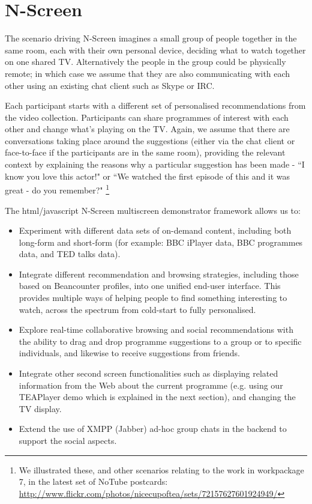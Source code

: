 \documentclass{notube}
\begin{document}
\chapter{N-Screen}

The scenario driving N-Screen imagines a small group of people together in the same room, each with their own personal device, deciding what to watch together on one shared TV. Alternatively the people in the group could be physically remote; in which case we assume that they are also communicating with each other using an existing chat client such as Skype or IRC.

Each participant starts with a different set of personalised recommendations from the video collection. Participants can share programmes of interest with each other and change what's playing on the TV. Again, we assume that there are conversations taking place around the suggestions (either via the chat client or face-to-face if the participants are in the same room), providing the relevant context by explaining the reasons why a particular suggestion has been made  - ``I know you love this actor!" or ``We watched the first episode of this and it was great - do you remember?"
\footnote{We illustrated these, and other scenarios relating to the work in workpackage 7, in the latest set of NoTube postcards: \url{http://www.flickr.com/photos/nicecupoftea/sets/72157627601924949/}}

The html/javascript N-Screen multiscreen demonstrator framework allows us to:

\begin{itemize}
\item{Experiment with different data sets of on-demand content, including both long-form and short-form (for example: BBC iPlayer data, BBC programmes data, and TED talks data).}
\item{Integrate different recommendation and browsing strategies, including those based on Beancounter profiles, into one unified end-user interface. This provides multiple ways of helping people to find something interesting to watch, across the spectrum from cold-start to fully personalised.}
\item{Explore real-time collaborative browsing and social recommendations with the ability to drag and drop programme suggestions to a group or to specific individuals, and likewise to receive suggestions from friends.}
\item{Integrate other second screen functionalities such as displaying related information from the Web about the current programme (e.g. using our TEAPlayer demo which is explained in the next section), and changing the TV display.}
\item{Extend the use of XMPP (Jabber) ad-hoc group chats in the backend to support the social aspects.}
\end{itemize}
\end{document}
